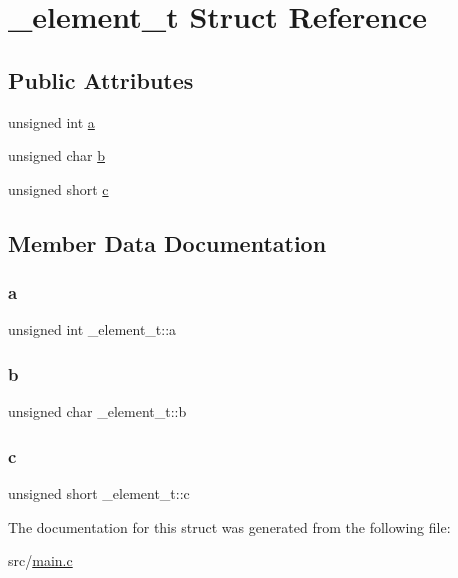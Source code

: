 \hypertarget{struct__element__t}{}\section{\+\_\+element\+\_\+t Struct Reference}
\label{struct__element__t}
\subsection*{Public Attributes}
\begin{DoxyCompactItemize}
\item 
unsigned int \hyperlink{struct__element__t_a2aa5101589f71608151c7842aef13119}{a}
\item 
unsigned char \hyperlink{struct__element__t_a62e51d0143ba2ab6d29911002f40200b}{b}
\item 
unsigned short \hyperlink{struct__element__t_ac0b716389d3e4119d0cf84b4340aa1fe}{c}
\end{DoxyCompactItemize}


\subsection{Member Data Documentation}
\hypertarget{struct__element__t_a2aa5101589f71608151c7842aef13119}{}\label{struct__element__t_a2aa5101589f71608151c7842aef13119} 
\subsubsection{\texorpdfstring{a}{a}}
{\footnotesize\ttfamily unsigned int \+\_\+element\+\_\+t\+::a}

\hypertarget{struct__element__t_a62e51d0143ba2ab6d29911002f40200b}{}\label{struct__element__t_a62e51d0143ba2ab6d29911002f40200b} 
\subsubsection{\texorpdfstring{b}{b}}
{\footnotesize\ttfamily unsigned char \+\_\+element\+\_\+t\+::b}

\hypertarget{struct__element__t_ac0b716389d3e4119d0cf84b4340aa1fe}{}\label{struct__element__t_ac0b716389d3e4119d0cf84b4340aa1fe} 
\subsubsection{\texorpdfstring{c}{c}}
{\footnotesize\ttfamily unsigned short \+\_\+element\+\_\+t\+::c}



The documentation for this struct was generated from the following file\+:\begin{DoxyCompactItemize}
\item 
src/\hyperlink{main_8c}{main.\+c}\end{DoxyCompactItemize}
